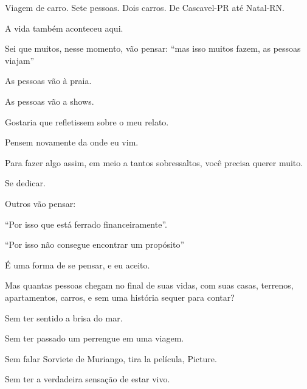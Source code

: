 Viagem de carro. Sete pessoas. Dois carros. De Cascavel-PR até Natal-RN.

A vida também aconteceu aqui.

Sei que muitos, nesse momento, vão pensar: “mas isso muitos fazem, as pessoas viajam”

As pessoas vão à praia. 

As pessoas vão a shows. 

Gostaria que refletissem sobre o meu relato. 

Pensem novamente da onde eu vim. 

Para fazer algo assim, em meio a tantos sobressaltos, você precisa querer muito. 

Se dedicar. 

Outros vão pensar: 

“Por isso que está ferrado financeiramente”.

“Por isso não consegue encontrar um propósito”

É uma forma de se pensar, e eu aceito. 

Mas quantas pessoas chegam no final de suas vidas, com suas casas, terrenos, apartamentos, carros, e sem uma história sequer para contar? 

Sem ter sentido a brisa do mar. 

Sem ter passado um perrengue em uma viagem.

Sem falar Sorviete de Muriango, tira la película, Picture.

Sem ter a verdadeira sensação de estar vivo.
